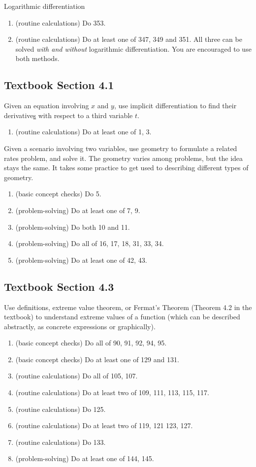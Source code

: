 \documentclass[../main.tex]{subfiles}
\begin{document}
Logarithmic differentiation
\begin{enumerate}
  \item (routine calculations) Do 353.
  \item (routine calculations) Do at least one of 347, 349 and 351. All three can be solved \emph{with and without} logarithmic differentiation. You are encouraged to use both methods. 
\end{enumerate}

\subsection*{Textbook Section 4.1}

Given an equation involving \(x\) and \(y\), use implicit differentiation to find their derivative\underline{s} with respect to a third variable \(t\).
\begin{enumerate}
  \item (routine calculations) Do at least one of 1, 3.
\end{enumerate}

Given a scenario involving two variables, use geometry to formulate a related rates problem, and solve it.  The geometry varies among problems, but the idea stays the same. It takes some practice to get used to describing different types of geometry. 
\begin{enumerate}
  \item (basic concept checks) Do 5. 
  \item (problem-solving) Do at least one of 7, 9.
  \item (problem-solving) Do both 10 and 11.
  \item (problem-solving) Do all of 16, 17, 18, 31, 33, 34.
  \item (problem-solving) Do at least one of 42, 43.
\end{enumerate}
\clearpage

\subsection*{Textbook Section 4.3}

Use definitions, extreme value theorem, or Fermat's Theorem (Theorem 4.2 in the textbook) to understand extreme values of a function (which can be described abstractly, as concrete expressions or graphically).
\begin{enumerate}
  \item (basic concept checks) Do all of 90, 91, 92, 94, 95.
  \item (basic concept checks) Do at least one of 129 and 131.
  \item (routine calculations) Do all of 105, 107.
  \item (routine calculations) Do at least two of 109, 111, 113, 115, 117.
  \item (routine calculations) Do 125.
  \item (routine calculations) Do at least two of 119, 121 123, 127.
  \item (routine calculations) Do 133.
  \item (problem-solving) Do at least one of 144, 145.
\end{enumerate}
\end{document}
